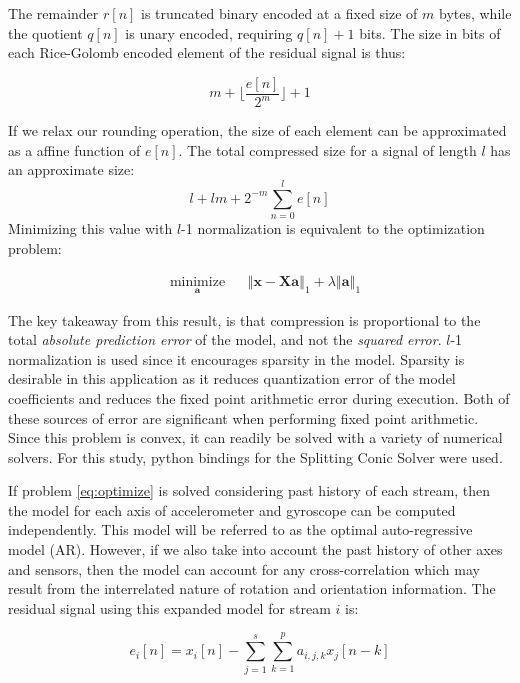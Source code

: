 \documentclass[journal]{IEEEtran}
\begin{document}
The remainder $r[n]$ is truncated binary encoded at a fixed size of $m$ bytes, while the quotient $q[n]$ is unary encoded, requiring $q[n] + 1$ bits. The size in bits of each Rice-Golomb encoded element of the residual signal is thus:

$$ m + \lfloor\frac{e[n]}{2^m}\rfloor + 1$$

If we relax our rounding operation, the size of each element can be approximated as a affine function of $e[n]$. The total compressed size for a signal of length $l$ has an approximate size:
 $$l+lm+ 2^{-m}\sum_{n=0}^l e[n]$$
 Minimizing this value with $l$-1 normalization is equivalent to the optimization problem:
 
\begin{equation}
\begin{aligned}
& \underset{\mathbf{a}}{\text{minimize}}
& & \left\Vert \mathbf{x}-\mathbf{Xa} \right\Vert_1 + \lambda\left\Vert \mathbf{a} \right\Vert_1
\label{eq:optimize}
\end{aligned}
\end{equation}

The key takeaway from this result, is that compression is proportional to the total \textit{absolute prediction error} of the model, and not the \textit{squared error}. $l$-1 normalization is used since it encourages sparsity in the model. Sparsity is desirable in this application as it reduces quantization error of the model coefficients and reduces the fixed point arithmetic error during execution. Both of these sources of error are significant when performing fixed point arithmetic. Since this problem is convex, it can readily be solved with a variety of numerical solvers. For this study, python bindings for the Splitting Conic Solver were used\cite{ocpb:16}\cite{scs}\cite{cvxpy}.

If problem \eqref{eq:optimize} is solved considering past history of each stream, then the model for each axis of accelerometer and gyroscope can be computed independently. This model will be referred to as the optimal auto-regressive model (AR). However, if we also take into account the past history of other axes and sensors, then the model can account for any cross-correlation which may result from the interrelated nature of rotation and orientation information. The residual signal using this expanded model for stream $i$ is:

\begin{equation}
e_i[n] = x_i[n] - \sum_{j=1}^{s}\sum_{k=1}^{p}a_{i,j,k}x_j[n-k]
\label{eq:error}
\end{equation}
\end{document}
